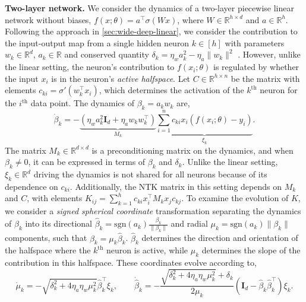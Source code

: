 \documentclass{article}
\theoremstyle{plain}
\theoremstyle{definition}
\theoremstyle{remark}
\begin{document}
\textbf{Two-layer network.}
%
We consider the dynamics of a two-layer piecewise linear network without biases, $f(x;\theta) = a^\intercal \sigma(W x)$, where $W \in \mathbb{R}^{h \times d}$ and $a \in \mathbb{R}^h$.
%
%
Following the approach in \cref{sec:wide-deep-linear}, we consider the contribution to the input-output map from a single hidden neuron $k \in [h]$ with parameters $w_k \in \mathbb{R}^d$, $a_k \in \mathbb{R}$ and conserved quantity $\delta_k = \eta_w a_k^2 - \eta_a\|w_k\|^2$ \cite{du2018algorithmic}.
%
However, unlike the linear setting, the neuron's contribution to $f(x_i;\theta)$ is regulated by whether the input $x_i$ is in the neuron's \emph{active halfspace}. %
%
Let $C \in \mathbb{R}^{h \times n}$ be the matrix with elements $c_{ki} = \sigma'(w_k^\intercal x_i)$, which determines the activation of the $k^{\mathrm{th}}$ neuron for the $i^{\mathrm{th}}$ data point. 
%
The dynamics of $\beta_k = a_kw_k$ are,
\begin{equation}
    \dot{\beta}_k = -\underbrace{\left(\eta_wa_k^2\mathbf{I}_d + \eta_aw_kw_k^\intercal\right)}_{M_k}\underbrace{\textstyle\sum_{i=1}^nc_{ki}x_i(f(x_i;\theta) - y_i)}_{\xi_k}.
\end{equation}
%
The matrix $M_k \in \mathbb{R}^{d \times d}$ is a preconditioning matrix on the dynamics, and when $\beta_k \neq 0$, it can be expressed in terms of $\beta_k$ and $\delta_k$.
%
Unlike the linear setting, $\xi_k \in \mathbb{R}^d$ driving the dynamics is not shared for all neurons because of its dependence on $c_{ki}$.
%
Additionally, the NTK matrix in this setting depends on $M_k$ and $C$, with elements $K_{ij} = \sum_{k = 1}^h c_{ki} x_i^\intercal M_k x_j c_{kj}$.
%
To examine the evolution of $K$, we consider a \emph{signed spherical coordinate} transformation separating the dynamics of $\beta_k$ into its directional $\hat{\beta}_k = \mathrm{sgn}(a_k)\tfrac{\beta_k}{\|\beta_k\|}$ and radial $\mu_k = \mathrm{sgn}(a_k)\|\beta_k\|$ components, such that $\beta_k = \mu_k \hat{\beta}_k$.
%
$\hat{\beta}_k$ determines the direction and orientation of the halfspace where the $k^{\mathrm{th}}$ neuron is active, while $\mu_k$ determines the slope of the contribution in this halfspace.
%
These coordinates evolve according to,
%
\begin{equation}
    \dot{\mu}_k = -\sqrt{\delta_k^2 + 4\eta_a\eta_w\mu_k^2}\hat{\beta}_k^\intercal \xi_k, \qquad
    \dot{\hat{\beta}}_k = -\frac{\sqrt{\delta_k^2 + 4\eta_a\eta_w\mu_k^2} + \delta_k}{2\mu_k} \left(\mathbf{I}_d - \hat{\beta}_k\hat{\beta}_k^\intercal\right)\xi_k.
\end{equation}
\end{document}

